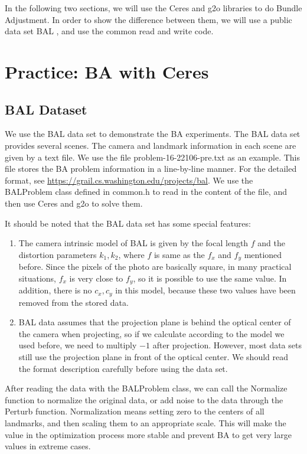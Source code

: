 In the following two sections, we will use the Ceres and g2o libraries to do Bundle Adjustment. In order to show the difference between them, we will use a public data set BAL {\cite{bundleadjustmentinlarge}}, and use the common read and write code.

\section{Practice: BA with Ceres}
\subsection{BAL Dataset}
We use the BAL data set to demonstrate the BA experiments. The BAL data set provides several scenes. The camera and landmark information in each scene are given by a text file. We use the file problem-16-22106-pre.txt as an example. This file stores the BA problem information in a line-by-line manner. For the detailed format, see \url{https://grail.cs.washington.edu/projects/bal}. We use the BALProblem class defined in common.h to read in the content of the file, and then use Ceres and g2o to solve them.

It should be noted that the BAL data set has some special features:
\begin{enumerate}
	\item  The camera intrinsic model of BAL is given by the focal length $f$ and the distortion parameters $k_1,k_2$, where $f$ is same as the $f_x$ and $f_y$ mentioned before. Since the pixels of the photo are basically square, in many practical situations, $f_x$ is very close to $f_y$, so it is possible to use the same value. In addition, there is no $c_x, c_y$ in this model, because these two values have been removed from the stored data.
	\item BAL data assumes that the projection plane is behind the optical center of the camera when projecting, so if we calculate according to the model we used before, we need to multiply $-1$ after projection. However, most data sets still use the projection plane in front of the optical center. We should read the format description carefully before using the data set.
\end{enumerate}

After reading the data with the BALProblem class, we can call the Normalize function to normalize the original data, or add noise to the data through the Perturb function. Normalization means setting zero to the centers of all landmarks, and then scaling them to an appropriate scale. This will make the value in the optimization process more stable and prevent BA to get very large values in extreme cases.

